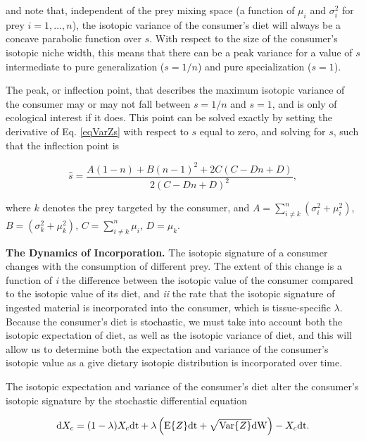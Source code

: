 \documentclass[11pt]{article}
\begin{document}
\noindent and note that, independent of the prey mixing space (a function of $\mu_i$ and $\sigma_i^2$ for prey $i=1,...,n$), the isotopic variance of the consumer's diet will always be a concave parabolic function over $s$.
With respect to the size of the consumer's isotopic niche width, this means that there can be a peak variance for a value of $s$ intermediate to pure generalization ($s=1/n$) and pure specialization ($s=1$).

The peak, or inflection point, that describes the maximum isotopic variance of the consumer may or may not fall between $s=1/n$ and $s=1$, and is only of ecological interest if it does.
This point can be solved exactly by setting the derivative of Eq. \ref{eqVarZs} with respect to $s$ equal to zero, and solving for $s$, such that the inflection point is

\begin{equation}
	\hat s = \frac{A(1-n)+B (n-1)^2+2 C (C-D n+D)}{2 (C-D n+D)^2},
\end{equation}

\noindent where $k$ denotes the prey targeted by the consumer, and $A = \sum_{i \neq k}^n \left(\sigma_i^2 + \mu_i^2\right)$, $B = \left(\sigma_k^2 + \mu_k^2\right)$, $C = \sum_{i \neq k}^n \mu_i$, $D = \mu_k$.


{\bf The Dynamics of Incorporation.}
The isotopic signature of a consumer changes with the consumption of different prey.
The extent of this change is a function of
\emph{i} the difference between the isotopic value of the consumer compared to the isotopic value of its diet, and
\emph{ii} the rate that the isotopic signature of ingested material is incorporated into the consumer, which is tissue-specific $\lambda$.
Because the consumer's diet is stochastic, we must take into account both the isotopic expectation of diet, as well as the isotopic variance of diet, and this will allow us to determine both the expectation and variance of the consumer's isotopic value as a give dietary isotopic distribution is incorporated over time.

The isotopic expectation and variance of the consumer's diet alter the consumer's isotopic signature by the stochastic differential equation

\begin{equation}
\label{eqSDE}
{\rm d}X_c = (1-\lambda)X_c{\rm dt} + \lambda\left({\rm E}\{Z\}{\rm dt} + \sqrt{{\rm Var}\{Z\}}{\rm dW}\right) - X_c{\rm dt}.
\end{equation}
\end{document}
